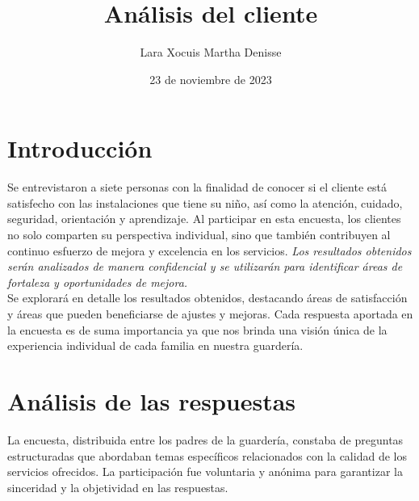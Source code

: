 \documentclass[letterpaper,12pt]{article}
\title {\textbf{Análisis del cliente}}
\author{Lara Xocuis Martha Denisse}
\date{23 de noviembre de 2023}
\begin{document}
\maketitle
\newpage
\begin{sloppypar}
\section{Introducción}
Se entrevistaron a siete personas con la finalidad de conocer si el cliente está satisfecho con las instalaciones que tiene su niño, así como la atención, cuidado, seguridad, orientación y aprendizaje. Al participar en esta encuesta, los clientes no solo comparten su perspectiva individual, sino que también contribuyen al continuo esfuerzo de mejora y excelencia en los servicios. \textit{Los resultados obtenidos serán analizados de manera confidencial y se utilizarán para identificar áreas de fortaleza y oportunidades de mejora.}
\vspace{0.3cm}\\ 
Se explorará en detalle los resultados obtenidos, destacando áreas de satisfacción y áreas que pueden beneficiarse de ajustes y mejoras. Cada respuesta aportada en la encuesta es de suma importancia ya que nos brinda una visión única de la experiencia individual de cada familia en nuestra guardería.
\newpage
\section{Análisis de las respuestas}
La encuesta, distribuida entre los padres de la guardería, constaba de preguntas estructuradas que abordaban temas específicos relacionados con la calidad de los servicios ofrecidos. La participación fue voluntaria y anónima para garantizar la sinceridad y la objetividad en las respuestas. 


\end{sloppypar}
\end{document}
